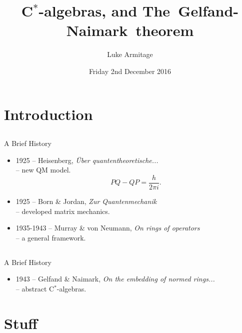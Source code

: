 \documentclass{beamer}
\title[Hypergraphs]
{C$^\ast$-algebras, and The~Gelfand-Naimark~theorem}
\author[L. Armitage] 
{Luke Armitage}
\date{Friday 2nd December 2016}
\begin{document}
\begin{frame}
  	\titlepage
\end{frame}


\section{Introduction}
\subsection{}
\begin{frame}{A Brief History}{}
 \begin{itemize}
	\item 1925 -- Heisenberg, 					%
		\emph{\"{U}ber quantentheoretische...}\\%
		-- new QM model.						%
		\[PQ-QP= \frac{h} {2 \pi i}.\]			%
											
	\item 1925 -- Born \& Jordan,
		\emph{Zur Quantenmechanik}\\			%
		-- developed matrix mechanics.		
			
	\item 1935-1943 -- Murray \& von Neumann,
		\emph{On rings of operators}\\			%
		-- a general framework. 				%
 \end{itemize}
\end{frame}

\subsection{}
\begin{frame}{A Brief History}{}
 \begin{itemize}
  	\item 1943 -- Gelfand \& Naimark,
  		\emph{On the embedding of normed rings...}\\  %
  		-- abstract C$^\ast$-algebras. 				  %
  		
 \end{itemize}
\end{frame}


\section{Stuff}
\end{document}
